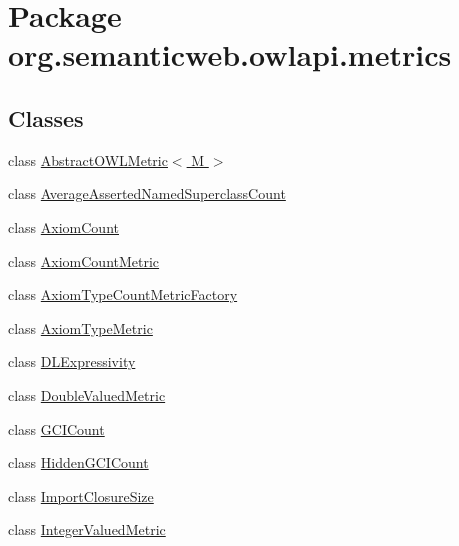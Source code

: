\hypertarget{namespaceorg_1_1semanticweb_1_1owlapi_1_1metrics}{\section{Package org.\-semanticweb.\-owlapi.\-metrics}
\label{namespaceorg_1_1semanticweb_1_1owlapi_1_1metrics}
}
\subsection*{Classes}
\begin{DoxyCompactItemize}
\item 
class \hyperlink{classorg_1_1semanticweb_1_1owlapi_1_1metrics_1_1_abstract_o_w_l_metric_3_01_m_01_4}{Abstract\-O\-W\-L\-Metric$<$ M $>$}
\item 
class \hyperlink{classorg_1_1semanticweb_1_1owlapi_1_1metrics_1_1_average_asserted_named_superclass_count}{Average\-Asserted\-Named\-Superclass\-Count}
\item 
class \hyperlink{classorg_1_1semanticweb_1_1owlapi_1_1metrics_1_1_axiom_count}{Axiom\-Count}
\item 
class \hyperlink{classorg_1_1semanticweb_1_1owlapi_1_1metrics_1_1_axiom_count_metric}{Axiom\-Count\-Metric}
\item 
class \hyperlink{classorg_1_1semanticweb_1_1owlapi_1_1metrics_1_1_axiom_type_count_metric_factory}{Axiom\-Type\-Count\-Metric\-Factory}
\item 
class \hyperlink{classorg_1_1semanticweb_1_1owlapi_1_1metrics_1_1_axiom_type_metric}{Axiom\-Type\-Metric}
\item 
class \hyperlink{classorg_1_1semanticweb_1_1owlapi_1_1metrics_1_1_d_l_expressivity}{D\-L\-Expressivity}
\item 
class \hyperlink{classorg_1_1semanticweb_1_1owlapi_1_1metrics_1_1_double_valued_metric}{Double\-Valued\-Metric}
\item 
class \hyperlink{classorg_1_1semanticweb_1_1owlapi_1_1metrics_1_1_g_c_i_count}{G\-C\-I\-Count}
\item 
class \hyperlink{classorg_1_1semanticweb_1_1owlapi_1_1metrics_1_1_hidden_g_c_i_count}{Hidden\-G\-C\-I\-Count}
\item 
class \hyperlink{classorg_1_1semanticweb_1_1owlapi_1_1metrics_1_1_import_closure_size}{Import\-Closure\-Size}
\item 
class \hyperlink{classorg_1_1semanticweb_1_1owlapi_1_1metrics_1_1_integer_valued_metric}{Integer\-Valued\-Metric}

\end{DoxyCompactItemize}
